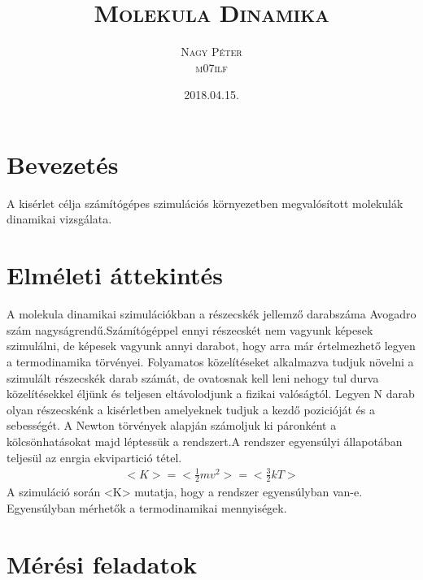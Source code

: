 \documentclass[paper=a4, fontsize=11pt]{article}
\title{\scshape\Huge Molekula Dinamika }
\date{\scshape\Large 2018.04.15.}
\author{\scshape\huge Nagy Péter\\\scshape\huge m07ilf}
\begin{document}
\maketitle
\newpage
\vspace{11cm}
\tableofcontents
\newpage
\section{Bevezetés}
A kisérlet célja számítógépes szimulációs környezetben megvalósított molekulák dinamikai vizsgálata. 

\section{Elméleti áttekintés}
A molekula dinamikai szimulációkban a részecskék jellemző darabszáma Avogadro szám nagyságrendű.Számítógéppel ennyi részecskét nem vagyunk képesek szimulálni, de képesek vagyunk annyi darabot, hogy arra már értelmezhető legyen a termodinamika törvényei. Folyamatos közelítéseket alkalmazva tudjuk növelni a szimulált részecskék darab számát, de ovatosnak kell leni nehogy tul durva közelítésekkel éljünk és teljesen eltávolodjunk a fizikai valóságtól. Legyen N darab olyan részecskénk a kisérletben amelyeknek tudjuk a kezdő pozicióját és a sebességét. A Newton törvények alapján számoljuk ki páronként a kölcsönhatásokat majd léptessük a rendszert.A rendszer egyensúlyi állapotában teljesül az enrgia ekvipartició tétel.
\begin{align}
< K >=< \frac{1}{2}mv^2 >=<\frac{3}{2}kT>
\end{align}
A szimuláció során <K> mutatja, hogy a rendszer egyensúlyban van-e. Egyensúlyban mérhetők a termodinamikai mennyiségek.

\section{Mérési feladatok}
\end{document}
